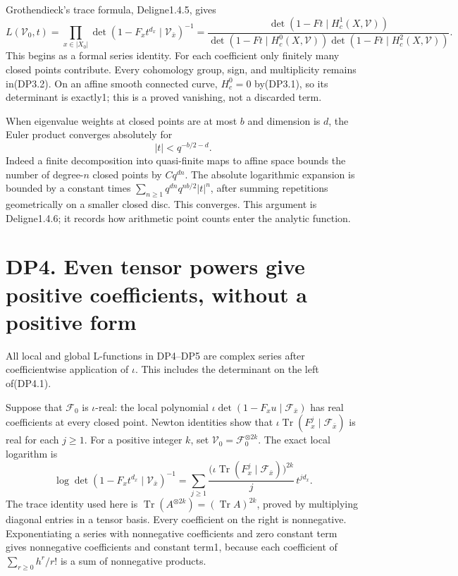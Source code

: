 \documentclass[
]{report}
\begin{document}
Grothendieck's trace formula, Deligne1.4.5, gives \[
L(\mathcal V_0,t)
=\prod_{x\in|X_0|}\det(1-F_x t^{d_x}\mid\mathcal V_{\bar x})^{-1}
=\frac{\det(1-Ft\mid H_c^1(X,\mathcal V))}
{\det(1-Ft\mid H_c^0(X,\mathcal V))
 \det(1-Ft\mid H_c^2(X,\mathcal V))}.
\tag{DP3.2}
\] This begins as a formal series identity. For each coefficient only
finitely many closed points contribute. Every cohomology group, sign,
and multiplicity remains in(DP3.2). On an affine smooth connected curve,
\(H_c^0=0\) by(DP3.1), so its determinant is exactly1; this is a proved
vanishing, not a discarded term.

When eigenvalue weights at closed points are at most \(b\) and dimension
is \(d\), the Euler product converges absolutely for \[
|t|<q^{-b/2-d}.
\tag{DP3.3}
\] Indeed a finite decomposition into quasi-finite maps to affine space
bounds the number of degree-\(n\) closed points by \(Cq^{dn}\). The
absolute logarithmic expansion is bounded by a constant times
\(\sum_{n\ge1}q^{dn}q^{nb/2}|t|^n\), after summing repetitions
geometrically on a smaller closed disc. This converges. This argument is
Deligne1.4.6; it records how arithmetic point counts enter the analytic
function.

\section{DP4. Even tensor powers give positive coefficients, without a
positive
form}\label{dp4.-even-tensor-powers-give-positive-coefficients-without-a-positive-form}

All local and global L-functions in DP4--DP5 are complex series after
coefficientwise application of \(\iota\). This includes the determinant
on the left of(DP4.1).

Suppose that \(\mathcal F_0\) is \(\iota\)-real: the local polynomial
\(\iota\det(1-F_x u\mid\mathcal F_{\bar x})\) has real coefficients at
every closed point. Newton identities show that
\(\iota\operatorname{Tr}(F_x^j\mid\mathcal F_{\bar x})\) is real for
each \(j\ge1\). For a positive integer \(k\), set
\(\mathcal V_0=\mathcal F_0^{\otimes 2k}\). The exact local logarithm is
\[
\log\det(1-F_x t^{d_x}\mid\mathcal V_{\bar x})^{-1}
=\sum_{j\ge1}\frac{
 \bigl(\iota\operatorname{Tr}(F_x^j\mid\mathcal F_{\bar x})\bigr)^{2k}}
 {j}\,t^{j d_x}.
\tag{DP4.1}
\] The trace identity used here is
\(\operatorname{Tr}(A^{\otimes 2k})=(\operatorname{Tr}A)^{2k}\), proved
by multiplying diagonal entries in a tensor basis. Every coefficient on
the right is nonnegative. Exponentiating a series with nonnegative
coefficients and zero constant term gives nonnegative coefficients and
constant term1, because each coefficient of \(\sum_{r\ge0}h^r/r!\) is a
sum of nonnegative products.
\end{document}
